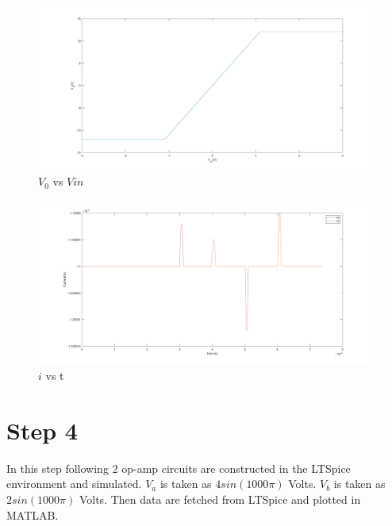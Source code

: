\documentclass[letterpaper,12pt]{article}
\begin{document}
\begin{figure}[H]
	\centering
   \includegraphics[width=1\textwidth]{3d_vs_vin.png}
   \caption{\(V_0\) vs \(V{in}\)}
\end{figure}

\begin{figure}[H]
	\centering
   \includegraphics[width=1\textwidth]{3d_i.png}
   \caption{\(i\) vs t}
\end{figure}

\section{Step 4}
In this step following 2 op-amp circuits are constructed in the LTSpice environment and simulated. \(V_{a}\) is taken as \(4sin(1000\pi)\) Volts. \(V_{b}\) is taken as \(2sin(1000\pi)\) Volts. Then data are fetched from LTSpice and plotted in MATLAB.
\end{document}
